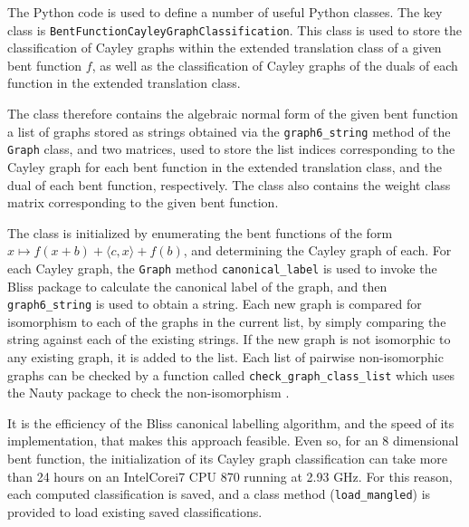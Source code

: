 The Python code is used to define a number of useful Python classes.
The key class is \texttt{BentFunctionCayleyGraphClassification}.
This class is used to store the classification of Cayley graphs within the extended translation
class of a given bent function $f$, as well as the classification of Cayley graphs of the duals of
each function in the extended translation class.

The class therefore contains the algebraic normal form of the given bent function
a list of graphs
stored as strings obtained via the \texttt{graph6\_string} \cite{McKP13nauty}
method of the \texttt{Graph} class, and two matrices,
used to store the list indices corresponding to
the Cayley graph for each bent function in the extended translation class, and the dual of each bent
function, respectively.
The class also contains the weight class matrix
corresponding to the given bent function.

The class is initialized by enumerating the bent functions of the form
$x \mapsto f(x+b) + \langle c, x \rangle + f(b)$,
and determining the Cayley graph of each.
For each Cayley graph, the \texttt{Graph} method \texttt{canonical\_label} is used
to invoke the Bliss package \cite{JunK07Bliss,JunK11conflict} to calculate the canonical label
of the graph, and then \texttt{graph6\_string} is used to obtain a string.
Each new graph is compared for isomorphism to each of the graphs in the current list,
by simply comparing the string against each of the existing strings.
If the new graph is not isomorphic to any existing graph, it is added to the list.
Each list of pairwise non-isomorphic graphs can be checked by a function called \texttt{check\_graph\_class\_list}
which uses the Nauty package to check the non-isomorphism \cite{McKP13nauty,McKP14practical}.

It is the efficiency of the Bliss canonical labelling algorithm, and the speed of its implementation, that makes this approach feasible.
Even so, for an 8 dimensional bent function, the initialization of its Cayley graph classification
can take more than 24 hours on an Intel\textregistered Core\texttrademark i7 CPU 870 running at 2.93 GHz.
For this reason, each computed classification is saved, and a class method (\texttt{load\_mangled})
is provided to load existing saved classifications.

